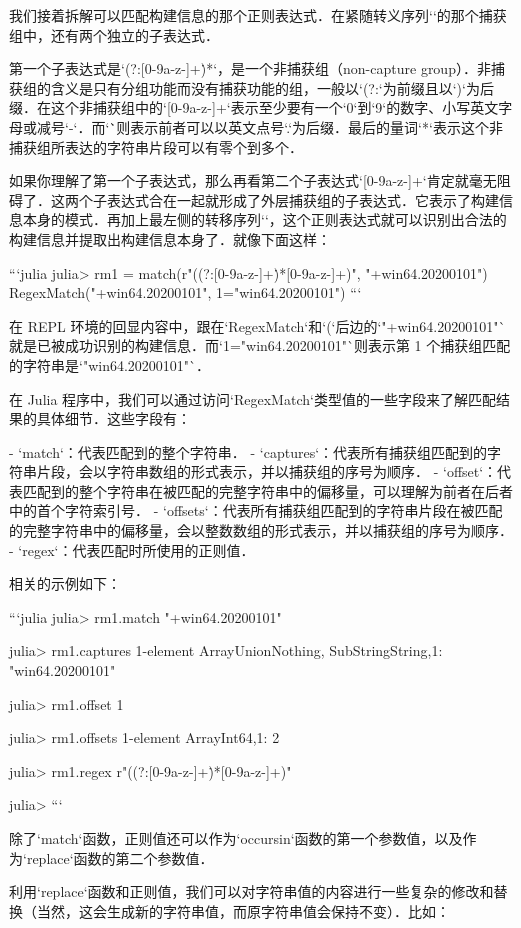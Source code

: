我们接着拆解可以匹配构建信息的那个正则表达式．在紧随转义序列`\+`的那个捕获组中，还有两个独立的子表达式．

第一个子表达式是`(?:[0-9a-z-]+\.)*`，是一个非捕获组（non-capture group）．非捕获组的含义是只有分组功能而没有捕获功能的组，一般以`(?:`为前缀且以`)`为后缀．在这个非捕获组中的`[0-9a-z-]+`表示至少要有一个`0`到`9`的数字、小写英文字母或减号`-`．而`\.`则表示前者可以以英文点号`.`为后缀．最后的量词`*`表示这个非捕获组所表达的字符串片段可以有零个到多个．

如果你理解了第一个子表达式，那么再看第二个子表达式`[0-9a-z-]+`肯定就毫无阻碍了．这两个子表达式合在一起就形成了外层捕获组的子表达式．它表示了构建信息本身的模式．再加上最左侧的转移序列`\+`，这个正则表达式就可以识别出合法的构建信息并提取出构建信息本身了．就像下面这样：

```julia
julia> rm1 = match(r"\+((?:[0-9a-z-]+\.)*[0-9a-z-]+)", "+win64.20200101")
RegexMatch("+win64.20200101", 1="win64.20200101")
```

在 REPL 环境的回显内容中，跟在`RegexMatch`和`(`后边的`"+win64.20200101"`就是已被成功识别的构建信息．而`1="win64.20200101"`则表示第 1 个捕获组匹配的字符串是`"win64.20200101"`．

在 Julia 程序中，我们可以通过访问`RegexMatch`类型值的一些字段来了解匹配结果的具体细节．这些字段有：

- `match`：代表匹配到的整个字符串．
- `captures`：代表所有捕获组匹配到的字符串片段，会以字符串数组的形式表示，并以捕获组的序号为顺序．
- `offset`：代表匹配到的整个字符串在被匹配的完整字符串中的偏移量，可以理解为前者在后者中的首个字符索引号．
- `offsets`：代表所有捕获组匹配到的字符串片段在被匹配的完整字符串中的偏移量，会以整数数组的形式表示，并以捕获组的序号为顺序．
- `regex`：代表匹配时所使用的正则值．

相关的示例如下：

```julia
julia> rm1.match
"+win64.20200101"

julia> rm1.captures
1-element Array{Union{Nothing, SubString{String}},1}:
 "win64.20200101"

julia> rm1.offset
1

julia> rm1.offsets
1-element Array{Int64,1}:
 2

julia> rm1.regex
r"\+((?:[0-9a-z-]+\.)*[0-9a-z-]+)"

julia> 
```

除了`match`函数，正则值还可以作为`occursin`函数的第一个参数值，以及作为`replace`函数的第二个参数值．

利用`replace`函数和正则值，我们可以对字符串值的内容进行一些复杂的修改和替换（当然，这会生成新的字符串值，而原字符串值会保持不变）．比如：

